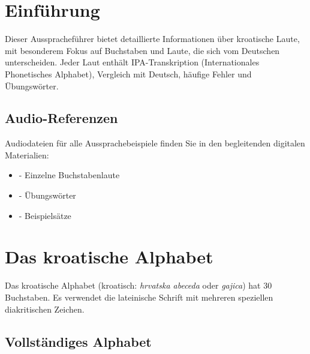 
\section{Einführung}

Dieser Ausspracheführer bietet detaillierte Informationen über kroatische Laute, mit besonderem Fokus auf Buchstaben und Laute, die sich vom Deutschen unterscheiden. Jeder Laut enthält IPA-Transkription (Internationales Phonetisches Alphabet), Vergleich mit Deutsch, häufige Fehler und Übungswörter.

\subsection{Audio-Referenzen}

Audiodateien für alle Aussprachebeispiele finden Sie in den begleitenden digitalen Materialien:
\begin{itemize}
    \item {} - Einzelne Buchstabenlaute
    \item {} - Übungswörter
    \item {} - Beispielsätze
\end{itemize}

\section{Das kroatische Alphabet}

Das kroatische Alphabet (kroatisch: \textit{hrvatska abeceda} oder \textit{gajica}) hat 30 Buchstaben. Es verwendet die lateinische Schrift mit mehreren speziellen diakritischen Zeichen.

\subsection{Vollständiges Alphabet}

